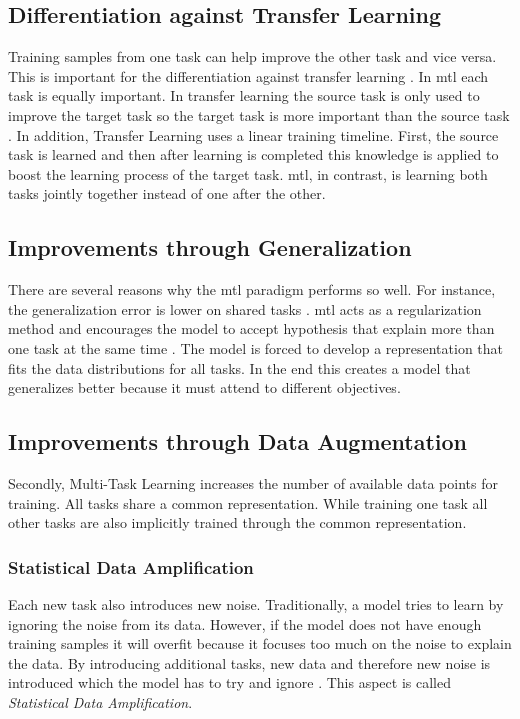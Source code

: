 \subsection{Differentiation against Transfer Learning}

Training samples from one task can help improve the other task and vice versa. This is important for the differentiation against transfer learning \cite{Pratt1993}. In \gls{mtl} each task is equally important. In transfer learning the source task is only used to improve the target task so the target task is more important than the source task \cite{Zhang2017a}. In addition, Transfer Learning uses a linear training timeline. First, the source task is learned and then after learning is completed this knowledge is applied to boost the learning process of the target task. \gls{mtl}, in contrast, is learning both tasks jointly together instead of one after the other.


\subsection{Improvements through Generalization}
\label{sec:03_mtlAdvantages}

There are several reasons why the \gls{mtl} paradigm performs so well. For instance, the generalization error is lower on shared tasks \cite{Caruana1993}. \gls{mtl} acts as a regularization method and encourages the model to accept hypothesis that explain more than one task at the same time \cite{Ruder2017}. The model is forced to develop a representation that fits the data distributions for all tasks. In the end this creates a model that generalizes better because it must attend to different objectives.

\subsection{Improvements through Data Augmentation}

Secondly, Multi-Task Learning increases the number of available data points for training. All tasks share a common representation. While training one task all other tasks are also implicitly trained through the common representation.

\subsubsection*{Statistical Data Amplification}

Each new task also introduces new noise. Traditionally, a model tries to learn by ignoring the noise from its data. However, if the model does not have enough training samples it will overfit because it focuses too much on the noise to explain the data. By introducing additional tasks, new data and therefore new noise is introduced which the model has to try and ignore \cite{Ruder2017}. This aspect is called \textit{Statistical Data Amplification}\cite{Caruana1995a}.

